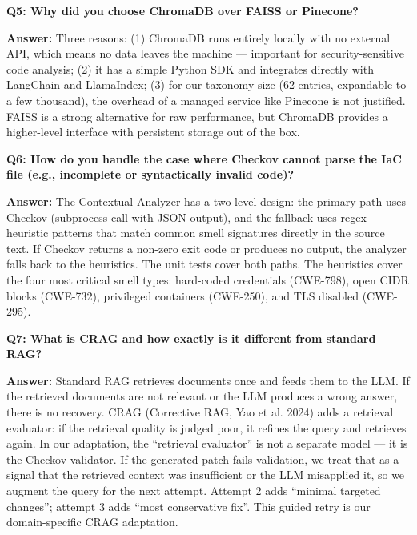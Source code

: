 \documentclass[12pt,a4paper]{article}
\begin{document}
\begin{qabox}
\textbf{Q5: Why did you choose ChromaDB over FAISS or Pinecone?}

\textbf{Answer:} Three reasons: (1) ChromaDB runs entirely locally with no external API, which means no data leaves the machine --- important for security-sensitive code analysis; (2) it has a simple Python SDK and integrates directly with LangChain and LlamaIndex; (3) for our taxonomy size (62 entries, expandable to a few thousand), the overhead of a managed service like Pinecone is not justified. FAISS is a strong alternative for raw performance, but ChromaDB provides a higher-level interface with persistent storage out of the box.
\end{qabox}

\begin{qabox}
\textbf{Q6: How do you handle the case where Checkov cannot parse the IaC file (e.g., incomplete or syntactically invalid code)?}

\textbf{Answer:} The Contextual Analyzer has a two-level design: the primary path uses Checkov (subprocess call with JSON output), and the fallback uses regex heuristic patterns that match common smell signatures directly in the source text. If Checkov returns a non-zero exit code or produces no output, the analyzer falls back to the heuristics. The unit tests cover both paths. The heuristics cover the four most critical smell types: hard-coded credentials (CWE-798), open CIDR blocks (CWE-732), privileged containers (CWE-250), and TLS disabled (CWE-295).
\end{qabox}

\begin{qabox}
\textbf{Q7: What is CRAG and how exactly is it different from standard RAG?}

\textbf{Answer:} Standard RAG retrieves documents once and feeds them to the LLM. If the retrieved documents are not relevant or the LLM produces a wrong answer, there is no recovery. CRAG (Corrective RAG, Yao et al. 2024) adds a retrieval evaluator: if the retrieval quality is judged poor, it refines the query and retrieves again. In our adaptation, the ``retrieval evaluator'' is not a separate model --- it is the Checkov validator. If the generated patch fails validation, we treat that as a signal that the retrieved context was insufficient or the LLM misapplied it, so we augment the query for the next attempt. Attempt 2 adds ``minimal targeted changes''; attempt 3 adds ``most conservative fix''. This guided retry is our domain-specific CRAG adaptation.
\end{qabox}
\end{document}
